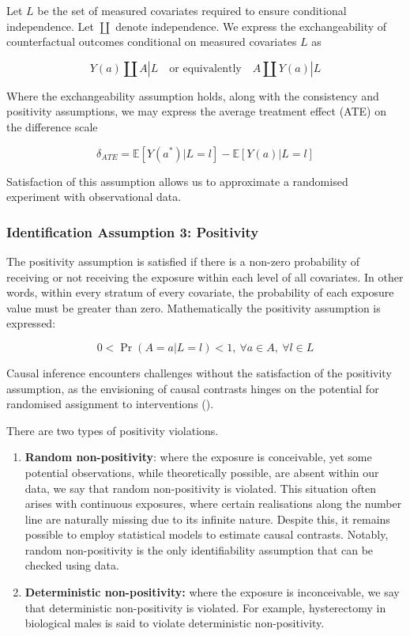 \documentclass[
  singlecolumn]{article}
\begin{document}
Let \(L\) be the set of measured covariates required to ensure
conditional independence. Let \(\coprod\) denote independence. We
express the exchangeability of counterfactual outcomes conditional on
measured covariates \(L\) as

\[
Y(a) \coprod  A|L \quad \text{or equivalently} \quad A \coprod  Y(a)|L
\]

Where the exchangeability assumption holds, along with the consistency
and positivity assumptions, we may express the average treatment effect
(ATE) on the difference scale

\[
\delta_{ATE}  = \mathbb{E}[Y(a^*)|L = l] - \mathbb{E}[Y(a)|L = l]
\]

Satisfaction of this assumption allows us to approximate a randomised
experiment with observational data.

\subsubsection{Identification Assumption 3:
Positivity}\label{identification-assumption-3-positivity}

The positivity assumption is satisfied if there is a non-zero
probability of receiving or not receiving the exposure within each level
of all covariates. In other words, within every stratum of every
covariate, the probability of each exposure value must be greater than
zero. Mathematically the positivity assumption is expressed:

\[
0 < \Pr(A=a|L=l)<1, ~ \forall a \in A, ~ \forall l \in L
\]

Causal inference encounters challenges without the satisfaction of the
positivity assumption, as the envisioning of causal contrasts hinges on
the potential for randomised assignment to interventions
().

There are two types of positivity violations.

\begin{enumerate}
\def\labelenumi{\arabic{enumi}.}
\item
  \textbf{Random non-positivity}: where the exposure is conceivable, yet
  some potential observations, while theoretically possible, are absent
  within our data, we say that random non-positivity is violated. This
  situation often arises with continuous exposures, where certain
  realisations along the number line are naturally missing due to its
  infinite nature. Despite this, it remains possible to employ
  statistical models to estimate causal contrasts. Notably, random
  non-positivity is the only identifiability assumption that can be
  checked using data.
\item
  \textbf{Deterministic non-positivity:} where the exposure is
  inconceivable, we say that deterministic non-positivity is violated.
  For example, hysterectomy in biological males is said to violate
  deterministic non-positivity.
\end{enumerate}
\end{document}
